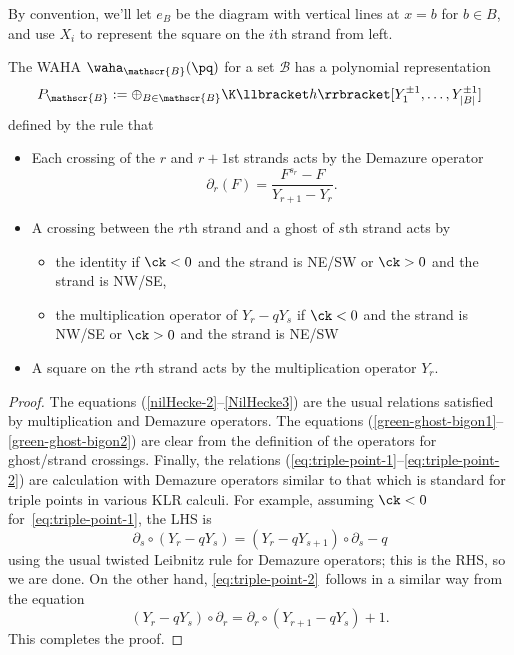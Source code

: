 By convention, we'll let $e_{B}$ be the diagram with vertical lines at
$x=b$ for $b\in B$, and use $X_i$ to represent the square on the $i$th
strand from left.
\begin{prop}\label{W-poly}
 The WAHA $\waha_{\mathscr{B}}(\pq)$ for a set $\mathscr{B}$ has a polynomial representation
 \[P_{\mathscr{B}} := \oplus_{B\in \mathscr{B}}\K\llbracket h\rrbracket [Y_1^{\pm 1},\dots,
 Y_{|B|}^{\pm 1}]\]
defined by the rule that 
\begin{itemize}
\item Each crossing of the $r$ and $r+1$st strands acts by the Demazure operator \[\partial_r(F)=
 \frac{F^{s_r}-F}{Y_{r+1}-Y_{r}}.\]
\item 
A crossing between the $r$th strand and a ghost of $s$th strand acts
by
\begin{itemize}
\item the identity if $\ck <0$ and the
 strand is NE/SW or $\ck >0$ and the strand is NW/SE,
\item the multiplication operator of $Y_r-qY_s$ if $\ck <0$ and
 the strand is NW/SE or $\ck >0$ and the strand is NE/SW
\end{itemize}
\item A square on the $r$th strand acts by the multiplication operator
 $Y_r$. 
\end{itemize}
\end{prop}
\begin{proof}
The equations (\ref{nilHecke-2}--\ref{NilHecke3}) are the usual
relations satisfied by multiplication and Demazure operators. The 
equations (\ref{green-ghost-bigon1}--\ref{green-ghost-bigon2}) are clear from
the definition of the operators for ghost/strand crossings. Finally,
the relations (\ref{eq:triple-point-1}--\ref{eq:triple-point-2}) are
calculation with Demazure operators similar to that which is standard
for triple points in various KLR calculi.
For example, assuming $\ck<0$ for~\eqref{eq:triple-point-1}, the
LHS is \[\partial_s\circ (Y_r-qY_s)=(Y_r-qY_{s+1})\circ\partial_s-q\]
using the usual twisted Leibnitz rule for Demazure operators; this is
the RHS, so we are done. On the other hand,
\eqref{eq:triple-point-2}~follows in a similar way from the equation
\[(Y_r-qY_s)\circ\partial_r = \partial_r \circ (Y_{r+1}-qY_s)+1.\] This
completes the proof.
\end{proof}

